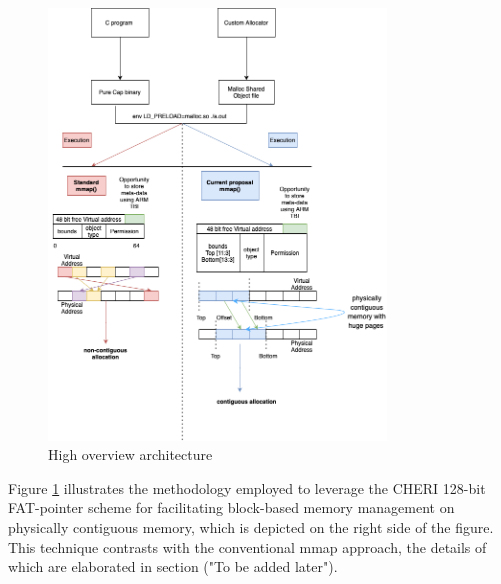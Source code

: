 \begin{figure}[h]
  \includegraphics[width=0.8\textwidth]{diagrams/HighOverviewArchitecture24.png}
  \caption{High overview architecture}
  \label{fig:HighOverviewArchitecture}
\end{figure}



Figure \ref{fig:HighOverviewArchitecture} illustrates the methodology employed to leverage the CHERI 
128-bit FAT-pointer scheme for facilitating block-based memory management
 on physically contiguous memory, which is depicted on the right side of the figure. 
 This technique contrasts with the conventional mmap approach, the details of which 
 are elaborated in section ("To be added later").

